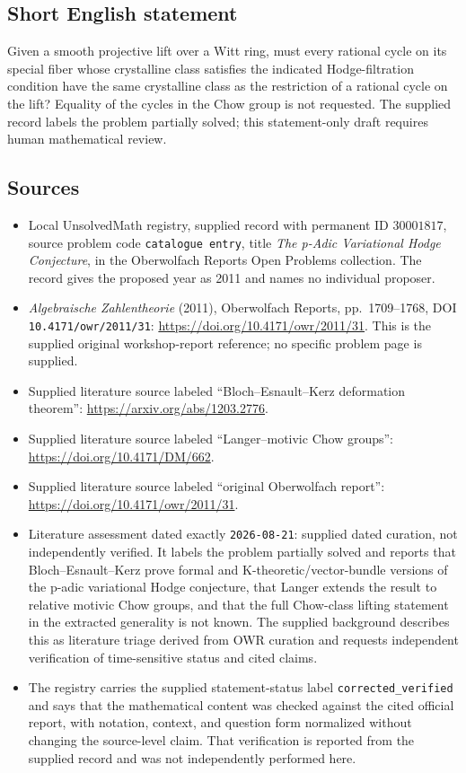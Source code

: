 \documentclass[11pt]{article}
\begin{document}
\subsection{Short English statement}
Given a smooth projective lift over a Witt ring, must every rational cycle on its special fiber whose crystalline class satisfies the indicated Hodge-filtration condition have the same crystalline class as the restriction of a rational cycle on the lift? Equality of the cycles in the Chow group is not requested. The supplied record labels the problem partially solved; this statement-only draft requires human mathematical review.
\subsection{Sources}
\begin{itemize}
\item Local UnsolvedMath registry, supplied record with permanent ID \(30001817\), source problem code \texttt{catalogue entry}, title \emph{The p-Adic Variational Hodge Conjecture}, in the Oberwolfach Reports Open Problems collection. The record gives the proposed year as 2011 and names no individual proposer.
\item \emph{Algebraische Zahlentheorie} (2011), Oberwolfach Reports, pp.\ 1709--1768, DOI \texttt{10.4171/owr/2011/31}: \url{https://doi.org/10.4171/owr/2011/31}. This is the supplied original workshop-report reference; no specific problem page is supplied.
\item Supplied literature source labeled ``Bloch--Esnault--Kerz deformation theorem'': \url{https://arxiv.org/abs/1203.2776}.
\item Supplied literature source labeled ``Langer--motivic Chow groups'': \url{https://doi.org/10.4171/DM/662}.
\item Supplied literature source labeled ``original Oberwolfach report'': \url{https://doi.org/10.4171/owr/2011/31}.
\item Literature assessment dated exactly \texttt{2026-08-21}: supplied dated curation, not independently verified. It labels the problem partially solved and reports that Bloch--Esnault--Kerz prove formal and K-theoretic/vector-bundle versions of the p-adic variational Hodge conjecture, that Langer extends the result to relative motivic Chow groups, and that the full Chow-class lifting statement in the extracted generality is not known. The supplied background describes this as literature triage derived from OWR curation and requests independent verification of time-sensitive status and cited claims.
\item The registry carries the supplied statement-status label \texttt{corrected\_verified} and says that the mathematical content was checked against the cited official report, with notation, context, and question form normalized without changing the source-level claim. That verification is reported from the supplied record and was not independently performed here.
\end{itemize}
\end{document}
